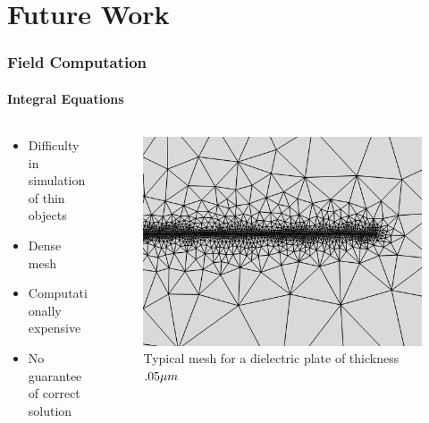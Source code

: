 \documentclass[mathserif,18pt,xcolor=table]{beamer}
\begin{document}
\section{Future Work}
\begin{frame}
  \frametitle{Field Computation}
  \framesubtitle{Integral Equations}
  \begin{columns} %
    \begin{column}[T]{.5\textwidth}
      \begin{itemize}
        \item Difficulty in simulation of thin objects
        \item Dense mesh
        \item Computationally expensive
        \item No guarantee of correct solution
      \end{itemize}
    \end{column}
    \begin{column}[T]{.5\textwidth}
      \begin{figure}[!t]
         \noindent
         \includegraphics[width=1\textwidth]{figures/mesh.png}
         \caption{Typical mesh for a dielectric plate of thickness $.05 \mu m$}
         \label{fig:mesh}
      \end{figure}
      \end{column}%
    \end{columns}
  \end{frame}
\end{document}
